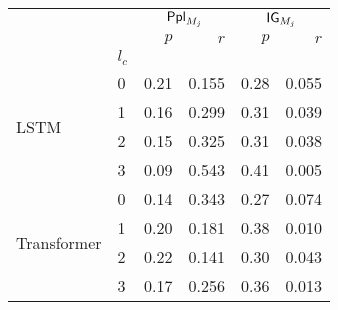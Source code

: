 \begin{tabular}{llrrrr}
\toprule
    & & \multicolumn{2}{c}{$\mathsf{Ppl}_{M_j}$} & \multicolumn{2}{c}{$\mathsf{IG}_{M_j}$} \\
                              &       &         $p$ &            $r$ &           $p$ &          $r$ \\
                              & $l_c$ &             &                &               &               \\
\midrule
\multirow{4}{*}{LSTM}         & 0     &        0.21 &         0.155 &          0.28 &        0.055 \\
                              & 1     &        0.16 &         0.299 &          0.31 &        0.039 \\
                              & 2     &        0.15 &         0.325 &          0.31 &        0.038 \\
                              & 3     &        0.09 &         0.543 &          0.41 &        0.005 \\
                              \midrule
\multirow{4}{*}{Transformer}  & 0     &        0.14 &         0.343 &          0.27 &        0.074 \\
                              & 1     &        0.20 &         0.181 &          0.38 &        0.010 \\
                              & 2     &        0.22 &         0.141 &          0.30 &        0.043 \\
                              & 3     &        0.17 &         0.256 &          0.36 &        0.013 \\
\bottomrule
\end{tabular}
